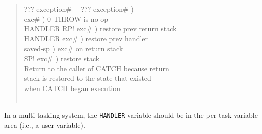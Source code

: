 \begin{quote}
\begin{tabbing}
	\+ \word{:}   ??? exception\# -{}- ??? exception\# ) \\
		\+  			\>\>  exc\# )	\>  0 THROW is no-op \\
			HANDLER  RP!			\>  exc\# ) \>  restore prev return stack \\
			 HANDLER \word{!}		\>  exc\# ) \>  restore prev handler \\
			   \>  saved-sp ) \>  exc\# on return stack \\
			SP!  		\>  exc\# ) 	\> \word{bs} restore stack \\
			 Return to the caller of CATCH because return \\
			 stack is restored to the state that existed \\
		\-	 when CATCH began execution \\
	\-  \\
	\word{;}
	\end{tabbing}
\end{quote}

In a multi-tasking system, the \texttt{HANDLER} variable should be in
the per-task variable area (i.e., a user variable).

